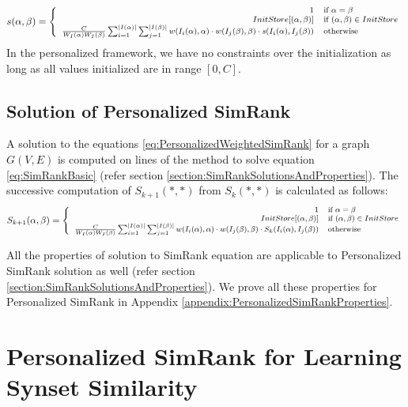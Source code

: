 \begin{equation} \label{eq:PersonalizedWeightedSimRank}
{\footnotesize
s(\alpha,\beta) =
\left\{ \begin{array}{rl}
1 & \mbox{if } \alpha=\beta\\
InitStore[(\alpha,\beta)] & \mbox{if } (\alpha,\beta) \in InitStore\\
\frac{C}{W_{I}(\alpha)W_{I}(\beta)} \sum_{i=1}^{|I(\alpha)|} \sum_{j=1}^{|I(\beta)|} w(I_i(\alpha),\alpha) \cdot w(I_j(\beta),\beta) \cdot s(I_i(\alpha),I_j(\beta)) & \mbox{otherwise }
\end{array}\right.
}
\end{equation}
In the personalized framework, we have no constraints over the initialization as long as all values initialized are in range $[0,C]$. 

\subsection{Solution of Personalized SimRank}
\label{section:ComputingPersonalizedSimRank}
A solution to the equations \ref{eq:PersonalizedWeightedSimRank} for a graph $G(V,E)$ is computed on lines of the method to solve equation \ref{eq:SimRankBasic} (refer section \ref{section:SimRankSolutionsAndProperties}). The successive computation of $S_{k+1}(\ast,\ast)$ from $S_k(\ast,\ast)$ is calculated as follows:
\begin{equation} \label{eq:PersonalizedWeightedSimRankSolution}
{\footnotesize
S_{k+1}(\alpha,\beta) =
\left\{ \begin{array}{rl}
1 & \mbox{if } \alpha=\beta\\
InitStore[(\alpha,\beta)] & \mbox{if } (\alpha,\beta) \in InitStore\\
\frac{C}{W_{I}(\alpha)W_{I}(\beta)} \sum_{i=1}^{|I(\alpha)|} \sum_{j=1}^{|I(\beta)|} w(I_i(\alpha),\alpha) \cdot w(I_j(\beta),\beta) \cdot S_k(I_i(\alpha),I_j(\beta)) & \mbox{otherwise}
\end{array}\right.
}
\end{equation}

All the properties of solution to SimRank equation are applicable to Personalized SimRank solution as well (refer section \ref{section:SimRankSolutionsAndProperties}). We prove all these properties for Personalized SimRank in Appendix \ref{appendix:PersonalizedSimRankProperties}.

\section{Personalized SimRank for Learning Synset Similarity}
\label{section:PersonalizedSimRankForLearningSynsetSimilarity}

